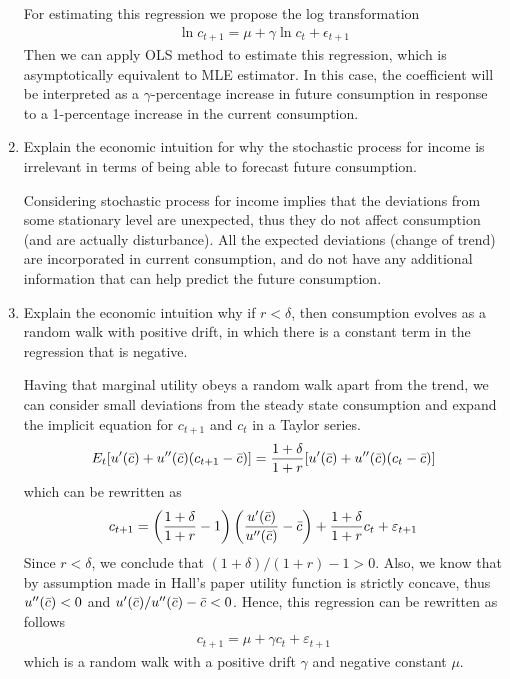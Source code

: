 \documentclass[11pt]{article}
\begin{document}
\begin{enumerate}
For estimating this regression we propose the log transformation
\begin{align*}
    \ln c_{t+1} = \mu + \gamma \ln c_t + \epsilon_{t+1}
\end{align*}
Then we can apply OLS method to estimate this regression, which is asymptotically equivalent to MLE estimator. In this case, the coefficient will be interpreted as a $\gamma$-percentage increase in future consumption in response to a 1-percentage increase in the current consumption.

\newpage
\item Explain the economic intuition for why the stochastic process for income is irrelevant in terms of being able to forecast future consumption. 

Considering stochastic process for income implies that the deviations from some stationary level are unexpected, thus they do not affect consumption (and are actually disturbance). All the expected deviations (change of trend) are incorporated in current consumption, and do not have any additional information that can help predict the future consumption.

\newpage
\item Explain the economic intuition why if $r < \delta$, then consumption evolves as a random walk with positive drift, in which there is a constant term in the regression that is negative. 

Having that marginal utility obeys a random walk apart from the trend, we can consider small deviations from the steady state consumption and expand the implicit equation for $c_{t+1}$ and $c_t$ in a Taylor series.
\begin{align*}
   E_t [u'(\Bar{c}) + u''(\Bar{c})(c_{t+1}-\Bar{c})] = \frac{1+\delta}{1+r} [u'(\Bar{c}) + u''(\Bar{c})(c_{t}-\Bar{c})]\\
\end{align*}
which can be rewritten as
\begin{align*}
    c_{t+1} = \left(\frac{1+\delta}{1+r} -1 \right) \left(\frac{u'(\Bar{c})}{u''(\Bar{c})}-\Bar{c}\right) + \frac{1+\delta}{1+r} c_t + \varepsilon_{t+1}
\end{align*}
Since $r<\delta$, we conclude that $(1+\delta)/(1+r)-1>0$. Also, we know that by assumption made in Hall's paper utility function is strictly concave, thus $u''(\Bar{c}) <0$ and $u'(\Bar{c})/u''(\Bar{c})-\Bar{c}<0$. Hence, this regression can be rewritten as follows
\begin{align*}
    c_{t+1} = \mu + \gamma c_t + \varepsilon_{t+1}
\end{align*}
which is a random walk with a positive drift $\gamma$ and negative constant $\mu$.


\end{enumerate}
\end{document}
